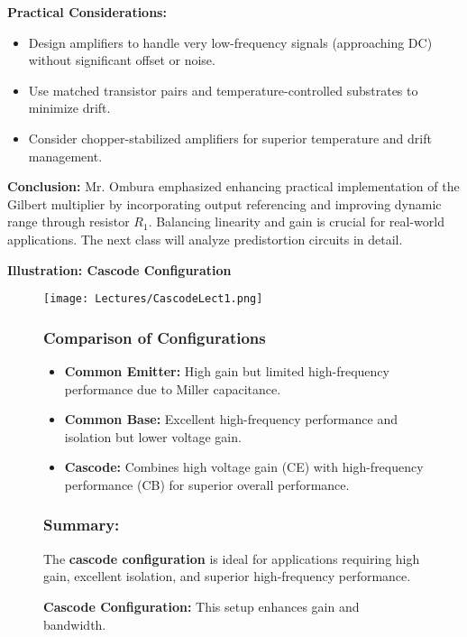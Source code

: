 \documentclass[a4paper,9pt,twoside,openany,twocolumn]{memoir}
\begin{document}
\textbf{Practical Considerations:}
\begin{itemize}[itemsep=0pt, topsep=2pt, leftmargin=4mm]
    \item Design amplifiers to handle very low-frequency signals (approaching DC) without significant offset or noise.
    \item Use matched transistor pairs and temperature-controlled substrates to minimize drift.
    \item Consider chopper-stabilized amplifiers for superior temperature and drift management.
\end{itemize}

\textbf{Conclusion:} Mr. Ombura emphasized enhancing practical implementation of the Gilbert multiplier by incorporating output referencing and improving dynamic range through resistor \( R_1 \). Balancing linearity and gain is crucial for real-world applications. The next class will analyze predistortion circuits in detail.

\textbf{Illustration: Cascode Configuration}
\begin{figure}[H]
    \begin{minipage}[t]{0.45\textwidth}
        \centering
        \texttt{[image: Lectures/CascodeLect1.png]}
        \caption*{\small \textbf{Cascode Configuration:} This setup enhances gain and bandwidth.}
    \end{minipage}%
    \hfill
    \begin{minipage}[t]{0.5\textwidth}
        \subsubsection*{Comparison of Configurations}
        \begin{itemize}[itemsep=0pt, topsep=2pt, leftmargin=4mm]
            \item \textbf{Common Emitter:} High gain but limited high-frequency performance due to Miller capacitance.
            \item \textbf{Common Base:} Excellent high-frequency performance and isolation but lower voltage gain.
            \item \textbf{Cascode:} Combines high voltage gain (CE) with high-frequency performance (CB) for superior overall performance.
        \end{itemize}
        \subsubsection*{Summary:} 
        The \textbf{cascode configuration} is ideal for applications requiring high gain, excellent isolation, and superior high-frequency performance.
    \end{minipage}
\end{figure}
\end{document}
